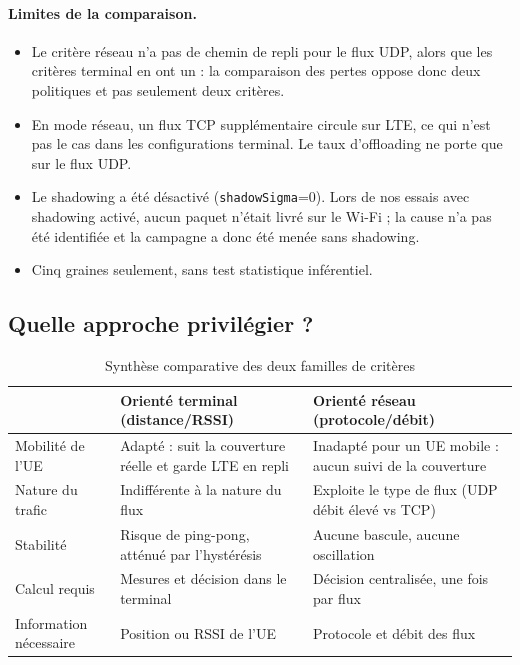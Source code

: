 \paragraph{Limites de la comparaison.}
\begin{itemize}
  \item Le critère réseau n'a pas de chemin de repli pour le flux UDP, alors
        que les critères terminal en ont un : la comparaison des pertes
        oppose donc deux politiques et pas seulement deux critères.
  \item En mode réseau, un flux TCP supplémentaire circule sur LTE, ce qui n'est
        pas le cas dans les configurations terminal. Le taux d'offloading ne
        porte que sur le flux UDP.
  \item Le shadowing a été désactivé (\texttt{shadowSigma}=0). Lors de nos essais
        avec shadowing activé, aucun paquet n'était livré sur le Wi-Fi ; la
        cause n'a pas été identifiée et la campagne a donc été menée sans
        shadowing.
  \item Cinq graines seulement, sans test statistique inférentiel.
\end{itemize}

\subsection{Quelle approche privilégier ?}

\begin{table}[H]
\centering
\caption{Synthèse comparative des deux familles de critères}
\small
\begin{tabular}{p{3.2cm}p{5.6cm}p{5.6cm}}
\toprule
 & Orienté terminal (distance/RSSI) & Orienté réseau (protocole/débit) \\
\midrule
Mobilité de l'UE & Adapté : suit la couverture réelle et garde LTE en repli & Inadapté pour un UE mobile : aucun suivi de la couverture \\
Nature du trafic & Indifférente à la nature du flux & Exploite le type de flux (UDP débit élevé vs TCP) \\
Stabilité & Risque de ping-pong, atténué par l'hystérésis & Aucune bascule, aucune oscillation \\
Calcul requis & Mesures et décision dans le terminal & Décision centralisée, une fois par flux \\
Information nécessaire & Position ou RSSI de l'UE & Protocole et débit des flux \\
\bottomrule
\end{tabular}
\end{table}


